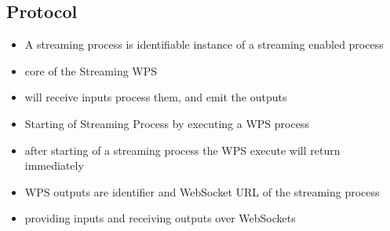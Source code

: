 	\subsection{Protocol}
		\begin{itemize}
			\item A streaming process is identifiable instance of a streaming enabled process
			\item core of the Streaming WPS
			\item will receive inputs process them, and emit the outputs
			\item Starting of Streaming Process by executing a WPS process
			\item after starting of a streaming process the WPS execute will return immediately
			\item WPS outputs are identifier and WebSocket URL of the streaming process
			\item providing inputs and receiving outputs over WebSockets


\end{itemize}
